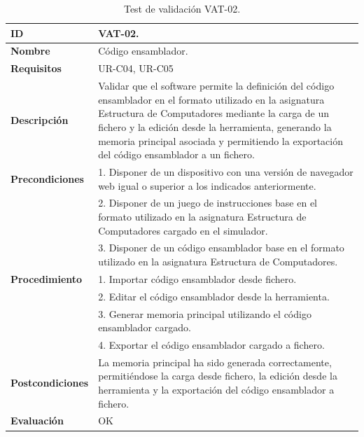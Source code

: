 \begin{center}
\begin{table}[htb]
\centering
\caption{Test de validación VAT-02.}
\begin{tabular}{@{}p{2.5cm} p{9cm}@{}} 
\toprule
\textbf{ID} 					& VAT-02. \\
\midrule
\textbf{Nombre} 				& Código \gls{ensamblador}. \\
\midrule
\textbf{Requisitos} 		& UR-C04, UR-C05 \\
\midrule
\textbf{Descripción} 		& Validar que el \gls{software} permite la definición del código \gls{ensamblador} en el formato utilizado en la asignatura Estructura de Computadores mediante la carga de un fichero y la edición desde la herramienta, generando la memoria principal asociada y permitiendo la exportación del código \gls{ensamblador} a un fichero. \\
\midrule
\textbf{Precondiciones}		& 1. Disponer de un dispositivo con una versión de navegador web igual o superior a los indicados anteriormente. \\
											& 2. Disponer de un juego de instrucciones base en el formato utilizado en la asignatura Estructura de Computadores cargado en el simulador. \\
											& 3. Disponer de un código \gls{ensamblador} base en el formato utilizado en la asignatura Estructura de Computadores. \\
\midrule
\textbf{Procedimiento}		& 1. Importar código \gls{ensamblador} desde fichero.\\
											& 2. Editar el código \gls{ensamblador} desde la herramienta.\\
											& 3. Generar memoria principal utilizando el código \gls{ensamblador} cargado.\\
											& 4. Exportar el código \gls{ensamblador} cargado a fichero. \\
\midrule
\textbf{Postcondiciones} 		&  La memoria principal ha sido generada correctamente, permitiéndose la carga desde fichero, la edición desde la herramienta y la exportación del código \gls{ensamblador} a fichero.\\
\midrule
\textbf{Evaluación} 			& OK \\
\bottomrule
\end{tabular}
\label{tab:vat-02}
\end{table}
\end{center}

